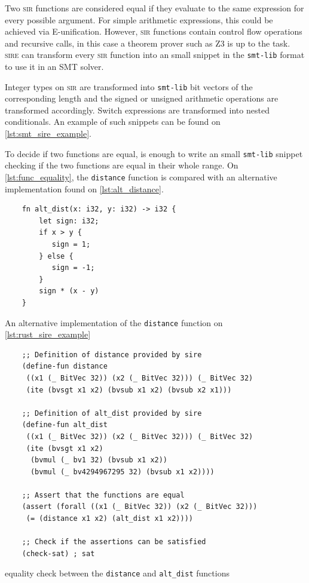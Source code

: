 Two \textsc{sir} functions are considered equal if they evaluate to the same
expression for every possible argument. For simple arithmetic expressions, this
could be achieved via E-unification. However, \textsc{sir} functions contain
control flow operations and recursive calls, in this case a theorem prover such
as Z3 is up to the task. \textsc{sire} can transform every \textsc{sir}
function into an small snippet in the \texttt{smt-lib} format to use it in an
SMT solver.

Integer types on \textsc{sir} are transformed into \texttt{smt-lib} bit vectors
of the corresponding length and the signed or unsigned arithmetic operations
are transformed accordingly.  Switch expressions are transformed into nested
conditionals. An example of such snippets can be found on
\ref{lst:smt_sire_example}. 

To decide if two functions are equal, is enough to write an small
\texttt{smt-lib} snippet checking if the two functions are equal in their whole
range. On \ref{lst:func_equality}, the \texttt{distance} function is compared
with an alternative implementation found on \ref{lst:alt_distance}. 

\begin{listing}[ht]
    \begin{verbatim}
    fn alt_dist(x: i32, y: i32) -> i32 {
        let sign: i32; 
        if x > y {
           sign = 1;
        } else {
           sign = -1;
        }
        sign * (x - y)
    }
    \end{verbatim}
    \caption{An alternative implementation of the \texttt{distance} function on \ref{lst:rust_sire_example}}
  \label{lst:alt_distance}
\end{listing}

\begin{listing}[ht]
    \begin{verbatim}
    ;; Definition of distance provided by sire
    (define-fun distance 
     ((x1 (_ BitVec 32)) (x2 (_ BitVec 32))) (_ BitVec 32) 
     (ite (bvsgt x1 x2) (bvsub x1 x2) (bvsub x2 x1)))

    ;; Definition of alt_dist provided by sire
    (define-fun alt_dist 
     ((x1 (_ BitVec 32)) (x2 (_ BitVec 32))) (_ BitVec 32) 
     (ite (bvsgt x1 x2) 
      (bvmul (_ bv1 32) (bvsub x1 x2)) 
      (bvmul (_ bv4294967295 32) (bvsub x1 x2))))
    
    ;; Assert that the functions are equal
    (assert (forall ((x1 (_ BitVec 32)) (x2 (_ BitVec 32))) 
     (= (distance x1 x2) (alt_dist x1 x2)))) 

    ;; Check if the assertions can be satisfied
    (check-sat) ; sat
    \end{verbatim}
    \caption{equality check between the \texttt{distance} and \texttt{alt\_dist} functions}
  \label{lst:func_equality}
\end{listing}

